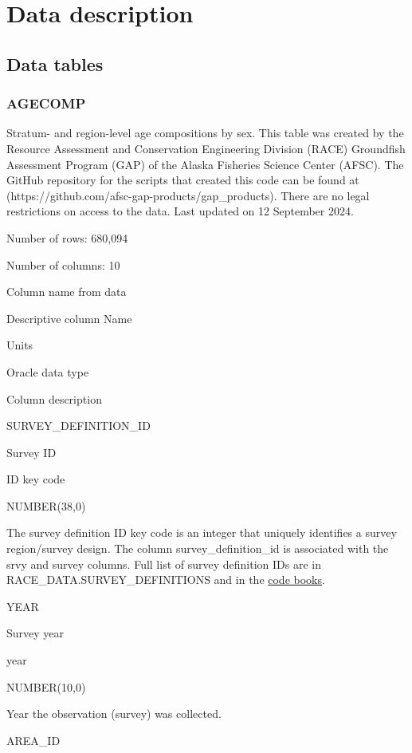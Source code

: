 \documentclass[
  letterpaper,
  oneside,
  open=any]{scrbook}
\begin{document}
\chapter{Data description}\label{data-description-1}

\section{Data tables}\label{data-tables}

\subsection{AGECOMP}\label{agecomp}

Stratum- and region-level age compositions by sex. This table was
created by the Resource Assessment and Conservation Engineering Division
(RACE) Groundfish Assessment Program (GAP) of the Alaska Fisheries
Science Center (AFSC). The GitHub repository for the scripts that
created this code can be found at
(https://github.com/afsc-gap-products/gap\_products). There are no legal
restrictions on access to the data. Last updated on 12 September 2024.

Number of rows: 680,094

Number of columns: 10

Column name from data

Descriptive column Name

Units

Oracle data type

Column description

SURVEY\_DEFINITION\_ID

Survey ID

ID key code

NUMBER(38,0)

The survey definition ID key code is an integer that uniquely identifies
a survey region/survey design. The column survey\_definition\_id is
associated with the srvy and survey columns. Full list of survey
definition IDs are in RACE\_DATA.SURVEY\_DEFINITIONS and in the
\href{https://www.fisheries.noaa.gov/resource/document/groundfish-survey-species-code-manual-and-data-codes-manual}{code
books}.

YEAR

Survey year

year

NUMBER(10,0)

Year the observation (survey) was collected.

AREA\_ID
\end{document}
